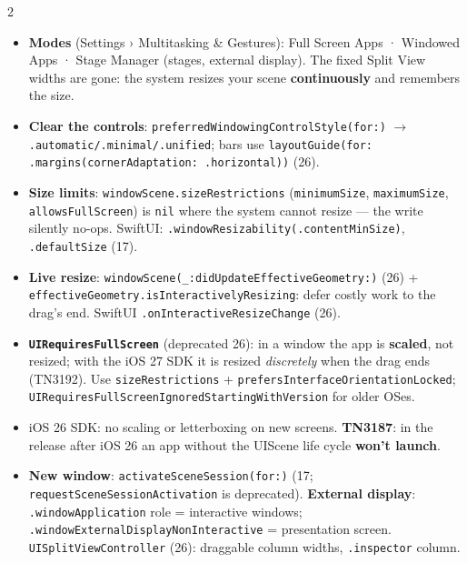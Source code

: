\documentclass[8pt]{extarticle}
\newcommand\ct[1]{\texttt{#1}}
\newcommand\hd[1]{\par\vspace{3pt}\noindent{\bfseries\color{sheetBlue}#1}\par\vspace{1pt}}
\begin{document}
\begin{multicols}{2}
\raggedright{}

\hd{IPadOS 26}
\begin{itemize}
  \item \textbf{Modes} (Settings › Multitasking \& Gestures): Full Screen Apps · Windowed Apps · Stage
        Manager (stages, external display). The fixed Split View widths are gone: the system resizes your
        scene \textbf{continuously} and remembers the size.
  \item \textbf{Clear the controls}: \ct{preferredWindowingControlStyle(for:)} $\to$
        \ct{.automatic/.minimal/.unified}; bars use
        \ct{layoutGuide(for: .margins(cornerAdaptation: .horizontal))} (26).
  \item \textbf{Size limits}: \ct{windowScene.sizeRestrictions} (\ct{minimumSize}, \ct{maximumSize},
        \ct{allowsFullScreen}) is \ct{nil} where the system cannot resize — the write silently no-ops.
        SwiftUI: \ct{.windowResizability(.contentMinSize)}, \ct{.defaultSize} (17).
  \item \textbf{Live resize}: \ct{windowScene(\_:didUpdateEffectiveGeometry:)} (26) +
        \ct{effectiveGeometry.isInteractivelyResizing}: defer costly work to the drag's end. SwiftUI
        \ct{.onInteractiveResizeChange} (26).
  \item \textbf{\ct{UIRequiresFullScreen}} (deprecated 26): in a window the app is \textbf{scaled}, not
        resized; with the iOS 27 SDK it is resized \emph{discretely} when the drag ends (TN3192). Use
        \ct{sizeRestrictions} + \ct{prefersInterfaceOrientationLocked};
        \ct{UIRequiresFullScreenIgnoredStartingWithVersion} for older OSes.
  \item iOS 26 SDK: no scaling or letterboxing on new screens. \textbf{TN3187}: in the release after iOS 26
        an app without the UIScene life cycle \textbf{won't launch}.
  \item \textbf{New window}: \ct{activateSceneSession(for:)} (17; \ct{requestSceneSessionActivation} is
        deprecated). \textbf{External display}: \ct{.windowApplication} role = interactive windows;
        \ct{.windowExternalDisplayNonInteractive} = presentation screen. \ct{UISplitViewController}
        (26): draggable column widths, \ct{.inspector} column.
\end{itemize}


\end{multicols}
\end{document}
